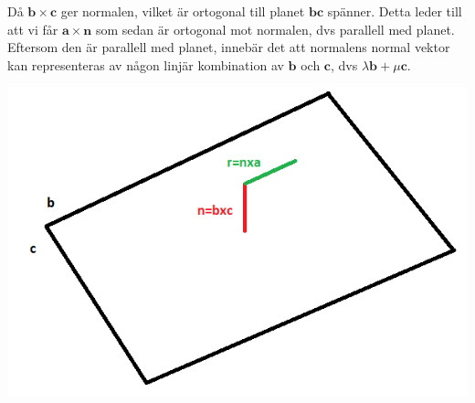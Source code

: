 Då $\bm{b}\times \bm{c}$ ger normalen, vilket är ortogonal till planet $\bm{bc}$ spänner. 
Detta leder till att vi får $\bm{a}\times \bm{n}$ som sedan är ortogonal mot normalen, dvs parallell med planet.
Eftersom den är parallell med planet, innebär det att normalens normal vektor kan representeras av någon linjär kombination av $\bm{b}$ och $\bm{c}$,
dvs $\lambda\bm{b} + \mu\bm{c}$.
\begin{center}
    \includegraphics[scale=0.4]{imgs/bild2.png}
\end{center}